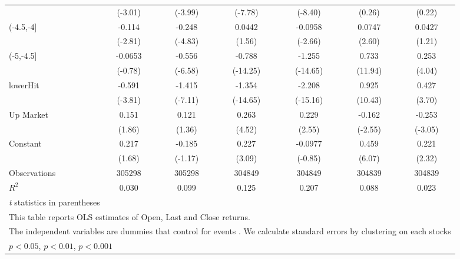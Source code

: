 {\begin{tabular}{l*{6}{c}}
                    &     (-3.01)         &     (-3.99)         &     (-7.78)         &     (-8.40)         &      (0.26)         &      (0.22)         \\
[1em]
(-4.5,-4]           &      -0.114\sym{**} &      -0.248\sym{***}&      0.0442         &     -0.0958\sym{**} &      0.0747\sym{**} &      0.0427         \\
                    &     (-2.81)         &     (-4.83)         &      (1.56)         &     (-2.66)         &      (2.60)         &      (1.21)         \\
[1em]
(-5,-4.5]           &     -0.0653         &      -0.556\sym{***}&      -0.788\sym{***}&      -1.255\sym{***}&       0.733\sym{***}&       0.253\sym{***}\\
                    &     (-0.78)         &     (-6.58)         &    (-14.25)         &    (-14.65)         &     (11.94)         &      (4.04)         \\
[1em]
lowerHit            &      -0.591\sym{***}&      -1.415\sym{***}&      -1.354\sym{***}&      -2.208\sym{***}&       0.925\sym{***}&       0.427\sym{***}\\
                    &     (-3.81)         &     (-7.11)         &    (-14.65)         &    (-15.16)         &     (10.43)         &      (3.70)         \\
[1em]
Up Market           &       0.151         &       0.121         &       0.263\sym{***}&       0.229\sym{*}  &      -0.162\sym{*}  &      -0.253\sym{**} \\
                    &      (1.86)         &      (1.36)         &      (4.52)         &      (2.55)         &     (-2.55)         &     (-3.05)         \\
[1em]
Constant            &       0.217         &      -0.185         &       0.227\sym{**} &     -0.0977         &       0.459\sym{***}&       0.221\sym{*}  \\
                    &      (1.68)         &     (-1.17)         &      (3.09)         &     (-0.85)         &      (6.07)         &      (2.32)         \\
\hline
Observations        &      305298         &      305298         &      304849         &      304849         &      304839         &      304839         \\
\(R^{2}\)           &       0.030         &       0.099         &       0.125         &       0.207         &       0.088         &       0.023         \\
\hline\hline
\multicolumn{7}{l}{\footnotesize \textit{t} statistics in parentheses}\\
\multicolumn{7}{l}{\footnotesize This table reports OLS estimates of Open, Last and Close returns.}\\
\multicolumn{7}{l}{\footnotesize The independent variables are dummies that control for events . We calculate standard errors by clustering on each stocks}\\
\multicolumn{7}{l}{\footnotesize \sym{*} \(p<0.05\), \sym{**} \(p<0.01\), \sym{***} \(p<0.001\)}\\
\end{tabular}
}
